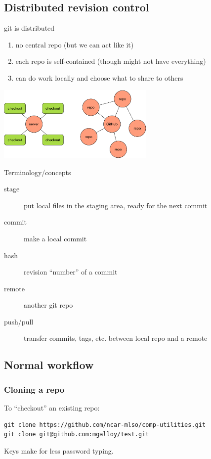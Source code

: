 \documentclass{beamer}
\begin{document}
\subsection{Distributed revision control}
\begin{frame}{git is distributed}
  \begin{enumerate}
    \item no central repo (but we can act like it)
    \item each repo is self-contained (though might not have everything)
    \item can do work locally and choose what to share to others
  \end{enumerate}
  \begin{center}
    \includegraphics[width=3in]{drc.pdf}
  \end{center}
\end{frame}

\begin{frame}{Terminology/concepts}
  \begin{description}
    \item[stage] put local files in the staging area, ready for the next commit
    \item[commit] make a local commit
    \item[hash] revision ``number'' of a commit
    \item[remote] another git repo
    \item[push/pull] transfer commits, tags, etc. between local repo and a remote
  \end{description}
\end{frame}

\subsection{Normal workflow}
\begin{frame}[fragile]
  \frametitle{Cloning a repo}
To ``checkout'' an existing repo:
  \begin{small}
  \begin{lstlisting}
git clone https://github.com/ncar-mlso/comp-utilities.git
git clone git@github.com:mgalloy/test.git
  \end{lstlisting}
  \end{small}
Keys make for less password typing.
\end{frame}
\end{document}
